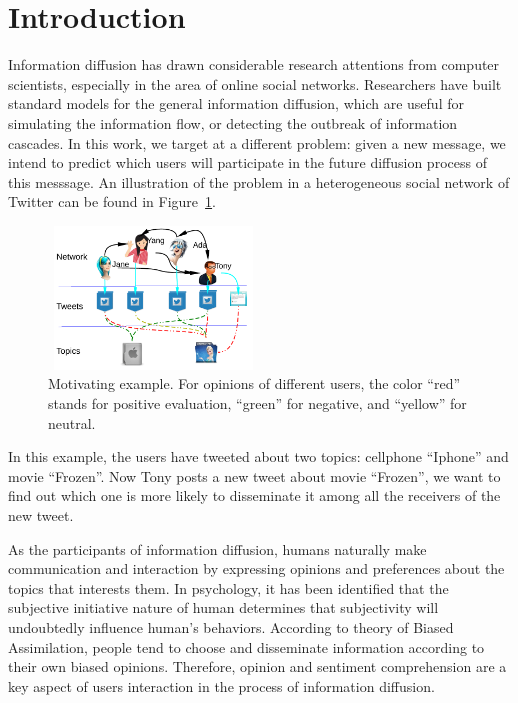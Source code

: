 \documentclass[letterpaper]{article}
\begin{document}
\section{Introduction}
\label{introduction}
\noindent Information diffusion has drawn considerable research attentions from computer scientists, especially in the area of online social networks. Researchers have built standard models for the general information diffusion,  which are useful for simulating the information flow\cite{goldenberg2001talk,kempe2003maximizing}, or detecting the outbreak of information cascades\cite{cheng2014can}. In this work, we target at a different problem: given a new message, we intend to predict which users will participate in the future diffusion process of this messsage\cite{Bian2014}. 
An illustration of the problem in a heterogeneous social network of Twitter can be found in Figure~\ref{fig00}. 
\begin{figure}[htb]
\centering
\includegraphics[width=2.2in,height=1.5in]{Mexample.pdf}
\caption{Motivating example. For opinions of different users, the color ``red'' stands for positive evaluation, ``green'' for negative, and ``yellow'' for neutral.}
\label{fig00}
\end{figure}
In this example, the users have tweeted about two topics: cellphone ``Iphone'' and movie ``Frozen''. Now Tony posts a new tweet about movie ``Frozen'', we want to find out which one is more likely to disseminate it among all the receivers of the new tweet.

As the participants of information diffusion, humans naturally make communication and interaction by expressing opinions and preferences about the topics that interests them. In psychology, it has been identified that the subjective initiative nature of human determines that subjectivity will undoubtedly influence human's behaviors\cite{moore2008awareness}. According to theory of Biased Assimilation, people tend to choose and disseminate information according to their own biased opinions\cite{Hyman2000}. Therefore, opinion and sentiment comprehension are a key aspect of users interaction in the process of information diffusion. 
\end{document}
